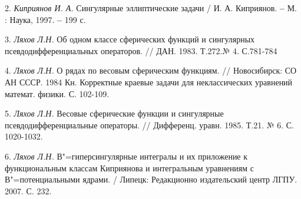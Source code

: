 2. {\it Киприянов И. А.} Сингулярные эллиптические задачи / И. А. Киприянов.
{\bf --} М. : Наука, 1997. {\bf --} 199 с.

3. {\it Ляхов Л.Н.} Об одном классе сферических функций и сингулярных псевдодифференциальных операторов. // ДАН. 1983. Т.272.№ 4. С.781-784

4. {\it Ляхов Л.Н.} О рядах по весовым сферическим функциям. //
Новосибирск: СО АН СССР. 1984
Кн. Корректные краевые задачи для неклассических уравнений математ. физики. С. 102-109.

5. {\it Ляхов Л.Н.} Весовые сферические функции и сингулярные псевдодифференциальные операторы.
// Дифференц. уравн. 1985. Т.21. № 6. С. 1020-1032.

6. {\it Ляхов Л.Н. }
В"=гиперсингулярные интегралы и их приложение к функциональным классам Киприянова и интегральным уравнениям с В"=потенциальными ядрами.
/ Липецк: Редакционно издательский центр ЛГПУ. 2007. С. 232.
